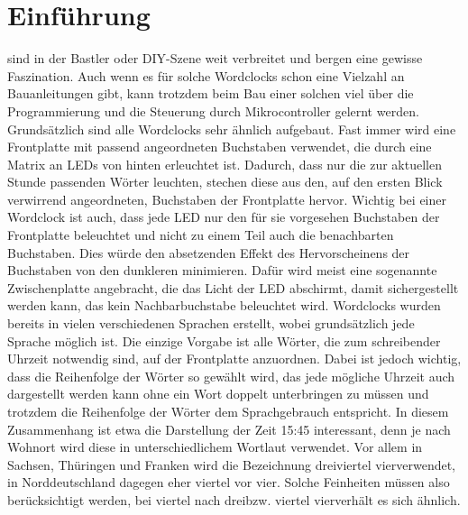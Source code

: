 \documentclass[12pt,journal,compsoc]{IEEEtran}
\begin{document}
%


\section{Einführung}

 sind in der Bastler oder DIY-Szene weit verbreitet und bergen eine gewisse Faszination. Auch wenn es für solche Wordclocks schon eine Vielzahl an Bauanleitungen gibt, kann trotzdem beim Bau einer solchen viel über die Programmierung und die Steuerung durch Mikrocontroller gelernt werden.
Grundsätzlich sind alle Wordclocks sehr ähnlich aufgebaut. Fast immer wird eine Frontplatte mit passend angeordneten  Buchstaben verwendet, die durch eine Matrix an LEDs von hinten erleuchtet ist. Dadurch, dass nur die zur aktuellen Stunde passenden   Wörter leuchten, stechen diese aus den, auf den ersten Blick verwirrend angeordneten, Buchstaben der Frontplatte hervor. Wichtig bei einer Wordclock ist auch, dass jede LED nur den für sie vorgesehen Buchstaben der Frontplatte beleuchtet und nicht zu einem Teil auch die benachbarten Buchstaben. Dies würde den absetzenden Effekt des Hervorscheinens der Buchstaben von den dunkleren minimieren. Dafür wird meist eine sogenannte Zwischenplatte angebracht, die das Licht der LED abschirmt, damit sichergestellt werden kann, das kein Nachbarbuchstabe beleuchtet wird.
Wordclocks wurden bereits in vielen verschiedenen Sprachen erstellt, wobei  grundsätzlich jede Sprache möglich ist. Die einzige Vorgabe ist alle Wörter, die zum \glqq schreiben\grqq der Uhrzeit notwendig sind, auf der Frontplatte anzuordnen. Dabei ist jedoch wichtig, dass die Reihenfolge der Wörter so gewählt wird, das jede mögliche Uhrzeit auch dargestellt werden kann ohne ein Wort doppelt unterbringen zu müssen und trotzdem die Reihenfolge der Wörter dem Sprachgebrauch entspricht. In diesem Zusammenhang ist etwa die Darstellung der Zeit 15:45 interessant, denn je nach Wohnort wird diese in unterschiedlichem Wortlaut verwendet. Vor allem in Sachsen, Thüringen und Franken wird die Bezeichnung \glqq dreiviertel vier\grqq verwendet, in Norddeutschland dagegen eher \glqq viertel vor vier\grqq. Solche Feinheiten müssen also berücksichtigt werden, bei \glqq viertel nach drei\grqq bzw. \glqq viertel vier\grqq verhält es sich ähnlich.
\end{document}
